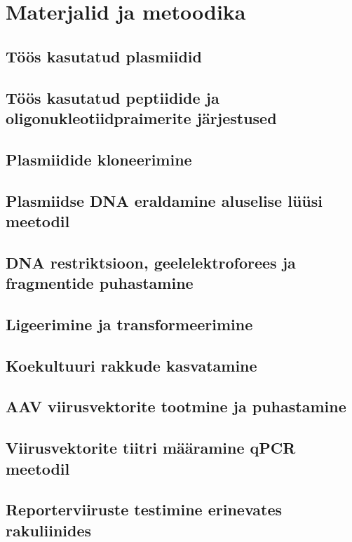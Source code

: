 \documentclass{trkut}%
\begin{document}
\section{Materjalid ja metoodika}

\subsection{Töös kasutatud plasmiidid}

\subsection{Töös kasutatud peptiidide ja oligonukleotiidpraimerite järjestused}

\subsection{Plasmiidide kloneerimine}

\subsection{Plasmiidse DNA eraldamine aluselise lüüsi meetodil}

\subsection{DNA restriktsioon, geelelektroforees ja fragmentide puhastamine}

\subsection{Ligeerimine ja transformeerimine}

\subsection{Koekultuuri rakkude kasvatamine}

\subsection{AAV viirusvektorite tootmine ja puhastamine}

\subsection{Viirusvektorite tiitri määramine qPCR meetodil}

\subsection{Reporterviiruste testimine erinevates rakuliinides}
\end{document}
